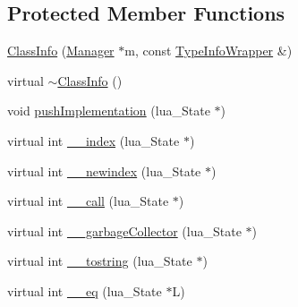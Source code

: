 \subsection*{Protected Member Functions}
\begin{DoxyCompactItemize}
\item 
\hyperlink{classSLB_1_1ClassInfo_a680b76dceb9c51eb539053887a929a13}{Class\+Info} (\hyperlink{classSLB_1_1Manager}{Manager} $\ast$m, const \hyperlink{classSLB_1_1TypeInfoWrapper}{Type\+Info\+Wrapper} \&)
\item 
virtual \hyperlink{classSLB_1_1ClassInfo_a8bc1f452092980d4d93a7f54466e1c4d}{$\sim$\+Class\+Info} ()
\item 
void \hyperlink{classSLB_1_1ClassInfo_a1d54e506c709d4c1b61b542682da4731}{push\+Implementation} (lua\+\_\+\+State $\ast$)
\item 
virtual int \hyperlink{classSLB_1_1ClassInfo_a4f176572e43c2cb9632b9be20cce7287}{\+\_\+\+\_\+index} (lua\+\_\+\+State $\ast$)
\item 
virtual int \hyperlink{classSLB_1_1ClassInfo_a9d8cda2482f6c89e027529d50407416e}{\+\_\+\+\_\+newindex} (lua\+\_\+\+State $\ast$)
\item 
virtual int \hyperlink{classSLB_1_1ClassInfo_a5623c7acc3ced156949d134e2b7cfae5}{\+\_\+\+\_\+call} (lua\+\_\+\+State $\ast$)
\item 
virtual int \hyperlink{classSLB_1_1ClassInfo_ac22b7a114052a4e100ad9d1303d978bb}{\+\_\+\+\_\+garbage\+Collector} (lua\+\_\+\+State $\ast$)
\item 
virtual int \hyperlink{classSLB_1_1ClassInfo_a86a70a3be08393ca1f98d26296aacc0d}{\+\_\+\+\_\+tostring} (lua\+\_\+\+State $\ast$)
\item 
virtual int \hyperlink{classSLB_1_1ClassInfo_a6ebf6dcff0d474a47c010a47223bd057}{\+\_\+\+\_\+eq} (lua\+\_\+\+State $\ast$L)
\end{DoxyCompactItemize}
